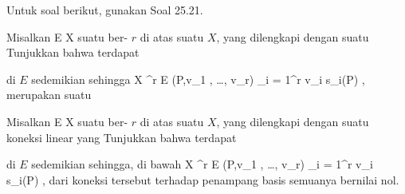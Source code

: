 Untuk soal berikut, gunakan
Soal 25.21.

{}
{

Misalkan
 { E } { X
} {}
suatu
ber-
$r$ di atas suatu
$X$, yang dilengkapi dengan suatu
Tunjukkan bahwa terdapat
 {} {}

 di $E$ sedemikian sehingga
\maabbeledisp {} {X \times \R^r} { E
} {(P,v_1  , \ldots , v_r)} { \sum_{i = 1}^r v_i s_i(P)
} {,}
merupakan suatu

}
{} {}

{}
{

Misalkan
 { E } { X
} {}
suatu
ber-
$r$ di atas suatu
$X$, yang dilengkapi dengan suatu koneksi linear yang
Tunjukkan bahwa terdapat
 {} {}

 di $E$ sedemikian sehingga, di bawah
\maabbeledisp {} {X \times \R^r} { E
} {(P,v_1 , \ldots , v_r)} { \sum_{i = 1}^r v_i s_i(P)
} {,}
dari koneksi tersebut terhadap penampang basis
 semuanya bernilai nol.

}
{} {}

